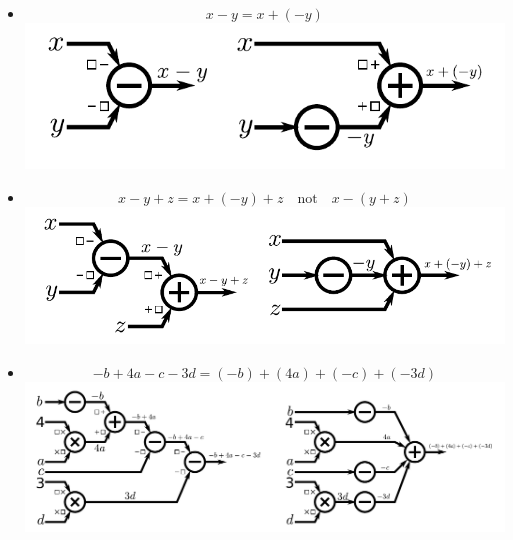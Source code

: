 \documentclass{article}
\begin{document}
\begin{itemize}
\item \[x - y = x + (-y)\]
\includegraphics[scale = 0.8]{expression_tree_11} 
\item \[x - y + z = x + (-y) + z \quad\text{not}\quad x - (y + z)\]
\includegraphics[scale = 0.8]{expression_tree_12}
\item \[-b + 4a - c - 3d = (-b) + (4a) + (-c) + (-3d)\]
\includegraphics[scale = 0.65]{expression_tree_13}
\end{itemize}




%
\end{document}
